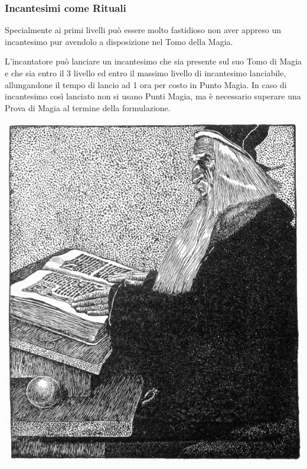 \begin{multicols}{2}

\subsubsection*{Incantesimi come Rituali}

Specialmente ai primi livelli può essere molto fastidioso non aver appreso un incantesimo pur avendolo a disposizione nel Tomo della Magia.

L'incantatore può lanciare un incantesimo che sia presente sul suo Tomo di Magia e che sia entro il 3 livello ed entro il massimo livello di incantesimo lanciabile, allungandone il tempo di lancio ad 1 ora per costo in Punto Magia. In caso di incantesimo così lanciato non si usano Punti Magia, ma è necessario superare una Prova di Magia al termine della formulazione.

\medskip

\begin{center}
\includegraphics[width=0.7\linewidth]{immagini/Arthur-Pyle_The_Enchanter_Merlin.png}


\end{center}
\end{multicols}
